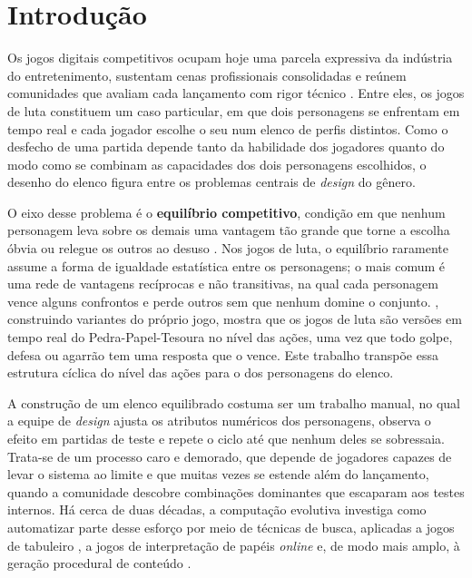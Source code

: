 \chapter[Introdução]{Introdução}
\label{chap: introducao}

Os jogos digitais competitivos ocupam hoje uma parcela expressiva da indústria do entretenimento, sustentam cenas profissionais consolidadas e reúnem comunidades que avaliam cada lançamento com rigor técnico \cite{newzoo2025,hamari2017esports}. Entre eles, os jogos de luta constituem um caso particular, em que dois personagens se enfrentam em tempo real e cada jogador escolhe o seu num elenco de perfis distintos. Como o desfecho de uma partida depende tanto da habilidade dos jogadores quanto do modo como se combinam as capacidades dos dois personagens escolhidos, o desenho do elenco figura entre os problemas centrais de \textit{design} do gênero.

O eixo desse problema é o \textbf{equilíbrio competitivo}, condição em que nenhum personagem leva sobre os demais uma vantagem tão grande que torne a escolha óbvia ou relegue os outros ao desuso \cite{adams2014fundamentals,elias2012characteristics}. Nos jogos de luta, o equilíbrio raramente assume a forma de igualdade estatística entre os personagens; o mais comum é uma rede de vantagens recíprocas e não transitivas, na qual cada personagem vence alguns confrontos e perde outros sem que nenhum domine o conjunto. , construindo variantes do próprio jogo, mostra que os jogos de luta são versões em tempo real do Pedra-Papel-Tesoura no nível das ações, uma vez que todo golpe, defesa ou agarrão tem uma resposta que o vence. Este trabalho transpõe essa estrutura cíclica do nível das ações para o dos personagens do elenco.

A construção de um elenco equilibrado costuma ser um trabalho manual, no qual a equipe de \textit{design} ajusta os atributos numéricos dos personagens, observa o efeito em partidas de teste e repete o ciclo até que nenhum deles se sobressaia. Trata-se de um processo caro e demorado, que depende de jogadores capazes de levar o sistema ao limite e que muitas vezes se estende além do lançamento, quando a comunidade descobre combinações dominantes que escaparam aos testes internos. Há cerca de duas décadas, a computação evolutiva investiga como automatizar parte desse esforço por meio de técnicas de busca, aplicadas a jogos de tabuleiro \cite{hom2007automatic,browne2010evolutionary}, a jogos de interpretação de papéis \textit{online} \cite{chen2014mmorpg} e, de modo mais amplo, à geração procedural de conteúdo \cite{togelius2011searchbased}.

